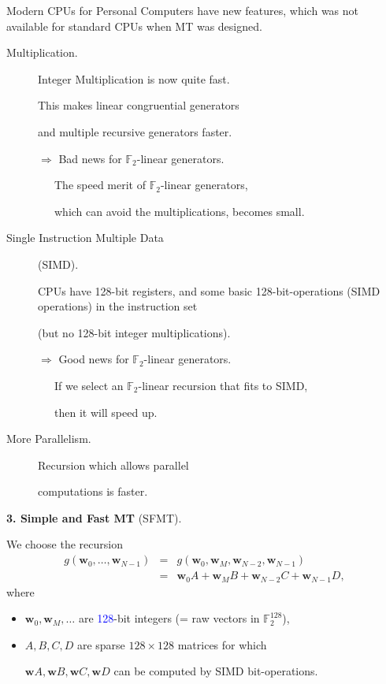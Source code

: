 \documentclass[a4j,12pt,landscape]{jarticle}
\def\F2{{\mathbb F}_2}
\def\bw{{{\mathbf w}}}
\begin{document}
Modern CPUs for Personal Computers have new features, 
which was not available for standard CPUs 
when MT was designed.
\begin{description}
\item[Multiplication.]
Integer Multiplication is now quite fast.

This makes linear congruential generators 

and multiple recursive generators faster.

$\Rightarrow$ 
Bad news for $\F2$-linear generators.

~~~The speed merit of $\F2$-linear generators,

~~~which can avoid the multiplications,
becomes small.

\newpage
\item[Single Instruction Multiple Data] (SIMD).

CPUs have 128-bit registers, and
some basic 128-bit-operations (SIMD operations) in the 
instruction set

(but no 128-bit integer multiplications).

$\Rightarrow$ 
Good news for $\F2$-linear generators.

~~~If we select an $\F2$-linear
recursion that fits to SIMD, 

~~~then it will speed up.

\item[More Parallelism.]

Recursion which allows parallel

 computations is faster.
\end{description}

\newpage
\noindent
{\bf 3. Simple and Fast MT} (SFMT).

We choose the recursion
\begin{eqnarray*}
g(\bw_0,\ldots,\bw_{N-1}) &=& g(\bw_0, \bw_M, \bw_{N-2}, \bw_{N-1}) \\
&=& \bw_0A + \bw_MB + \bw_{N-2}C + \bw_{N-1}D,
\end{eqnarray*}
where 
\begin{itemize}
\item
$\bw_0, \bw_M, \ldots$ are \textcolor{blue}{128}-bit integers 
(= raw vectors in $\F2^{128}$),

\item
$A, B, C, D$ are sparse $128 \times 128$ matrices
for which 

$\bw A, \bw B, \bw C, \bw D$ can be computed by
SIMD bit-operations.
\end{itemize}
\end{document}
